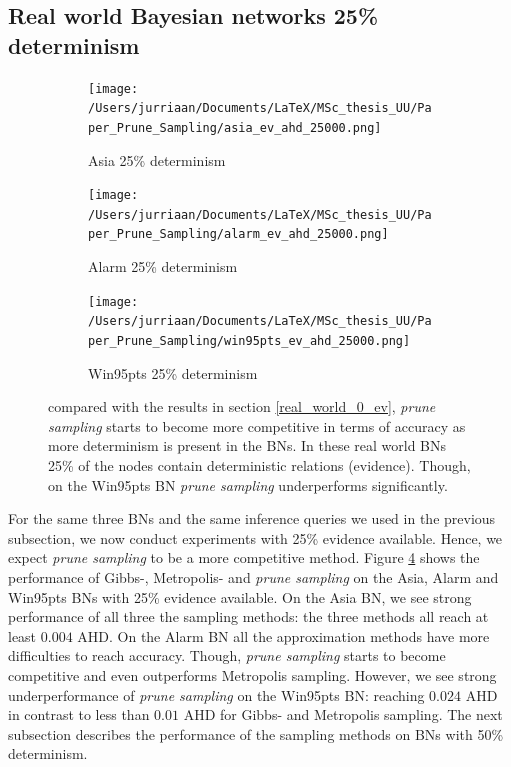 \documentclass[a4paper, twoside, 11pt]{report}
\theoremstyle{plain}
\theoremstyle{definition}
\theoremstyle{remark}
\newcommand{\ps}{\textit{prune sampling }}
\begin{document}
\subsection{Real world Bayesian networks 25\% determinism}\label{real_world_25_ev}
\begin{figure}[b!]
\centering
\begin{subfigure}{0.5\textwidth}
\texttt{[image: /Users/jurriaan/Documents/LaTeX/MSc\_thesis\_UU/Paper\_Prune\_Sampling/asia\_ev\_ahd\_25000.png]}
\caption{Asia 25\% determinism}%
\label{asia}%
\end{subfigure}\hfill%
\begin{subfigure}{0.5\textwidth}
\texttt{[image: /Users/jurriaan/Documents/LaTeX/MSc\_thesis\_UU/Paper\_Prune\_Sampling/alarm\_ev\_ahd\_25000.png]}
\caption{Alarm 25\% determinism}%
\label{alarm}%
\end{subfigure}%
\begin{subfigure}{0.5\textwidth}
\texttt{[image: /Users/jurriaan/Documents/LaTeX/MSc\_thesis\_UU/Paper\_Prune\_Sampling/win95pts\_ev\_ahd\_25000.png]}
\caption{Win95pts 25\% determinism}%
\label{win95pts}%
\end{subfigure}\hfill%
\vspace{0.75pc}
\caption{compared with the results in section \ref{real_world_0_ev}, \ps starts to become more competitive in terms of accuracy as more determinism is present in the BNs. In these real world BNs 25\% of the nodes contain deterministic relations (evidence). Though, on the Win95pts BN \ps underperforms significantly.}
\label{results2}
\end{figure}
For the same three BNs and the same inference queries we used in the previous subsection, we now conduct experiments with 25\% evidence available. Hence, we expect \ps to be a more competitive method. Figure \ref{results2} shows the performance of Gibbs-, Metropolis- and \ps on the Asia, Alarm and Win95pts BNs with 25\% evidence available. On the Asia BN, we see strong performance of all three the sampling methods: the three methods all reach at least $0.004$ AHD. On the Alarm BN all the approximation methods have more difficulties to reach accuracy. Though, \ps starts to become competitive and even outperforms Metropolis sampling. However, we see strong underperformance of \ps on the Win95pts BN: reaching $0.024$ AHD in contrast to less than $0.01$ AHD for Gibbs- and Metropolis sampling. The next subsection describes the performance of the sampling methods on BNs with 50\% determinism. 
\end{document}
